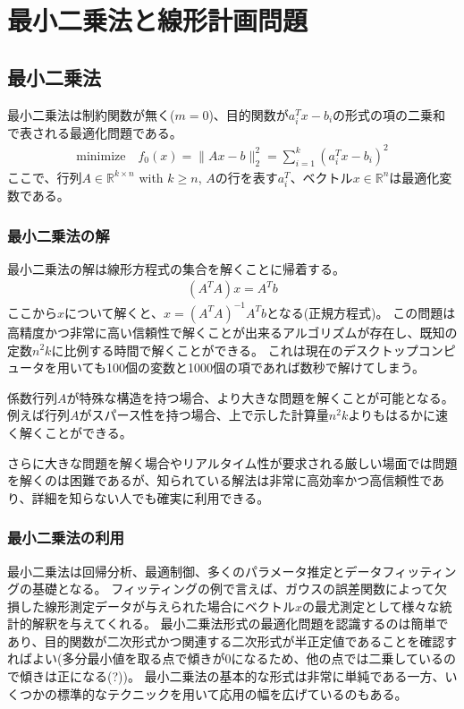 \documentclass[a4paper, 10pt, uplatex]{jsreport}
\begin{document}
\section{最小二乗法と線形計画問題}
\label{sc:least-square-and-LP}
\subsection{最小二乗法}
最小二乗法は制約関数が無く($m = 0$)、目的関数が$a^T_ix-b_i$の形式の項の二乗和で表される最適化問題である。
\begin{align}
    \text{minimize} \quad f_0(x) = \|Ax-b\|^2_2 = \sum^k_{i=1}(a^T_ix-b_i)^2 \label{eq:lsp}
\end{align}
ここで、行列$A \in \mathbb{R}^{k\times n}$ with $k \geq n$, $A$の行を表す$a_i^T$、ベクトル$x \in \mathbb{R}^n$は最適化変数である。

\subsubsection{最小二乗法の解}
最小二乗法の解は線形方程式の集合を解くことに帰着する。
\begin{align}
    (A^TA)x = A^Tb
\end{align}
ここから$x$について解くと、$x = (A^TA)^{-1}A^Tb$となる(正規方程式)。
この問題は高精度かつ非常に高い信頼性で解くことが出来るアルゴリズムが存在し、既知の定数$n^2k$に比例する時間で解くことができる。
これは現在のデスクトップコンピュータを用いても100個の変数と1000個の項であれば数秒で解けてしまう。

係数行列$A$が特殊な構造を持つ場合、より大きな問題を解くことが可能となる。
例えば行列$A$がスパース性を持つ場合、上で示した計算量$n^2k$よりもはるかに速く解くことができる。

さらに大きな問題を解く場合やリアルタイム性が要求される厳しい場面では問題を解くのは困難であるが、知られている解法は非常に高効率かつ高信頼性であり、詳細を知らない人でも確実に利用できる。

\subsubsection{最小二乗法の利用}
最小二乗法は回帰分析、最適制御、多くのパラメータ推定とデータフィッティングの基礎となる。
フィッティングの例で言えば、ガウスの誤差関数によって欠損した線形測定データが与えられた場合にベクトル$x$の最尤測定として様々な統計的解釈を与えてくれる。
最小二乗法形式の最適化問題を認識するのは簡単であり、目的関数が二次形式かつ関連する二次形式が半正定値であることを確認すればよい(多分最小値を取る点で傾きが0になるため、他の点では二乗しているので傾きは正になる(?))。
最小二乗法の基本的な形式は非常に単純である一方、いくつかの標準的なテクニックを用いて応用の幅を広げているのもある。
\end{document}
